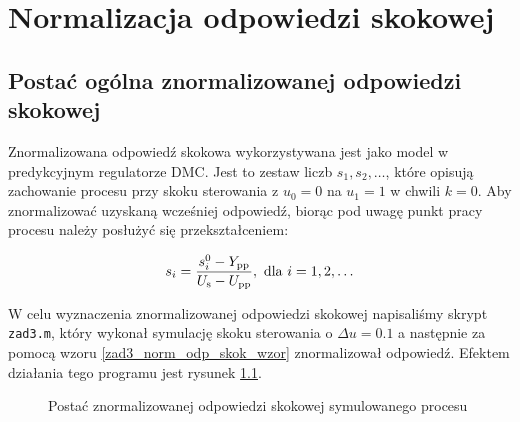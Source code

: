 \chapter{Normalizacja odpowiedzi skokowej}
\label{zad3}

\section{Postać ogólna znormalizowanej odpowiedzi skokowej}
Znormalizowana odpowiedź skokowa wykorzystywana jest jako model w predykcyjnym
regulatorze DMC. Jest to zestaw liczb $s_{1}, s_{2}, \ldots$, które opisują zachowanie
procesu przy skoku sterowania z $u_{\mathrm{0}}=\num{0}$ na $u_{\mathrm{1}}=\num{1}$ w chwili $k=\num{0}$. 
Aby znormalizować uzyskaną wcześniej odpowiedź, biorąc pod uwagę punkt pracy procesu należy
posłużyć się przekształceniem:

\begin{equation}
    s_{i} = \frac{s^{\mathrm{0}}_{i} - Y_{\mathrm{pp}}}{U_{\mathrm{s}} - U_{\mathrm{pp}}},  \hbox{ dla } i = 1,2,\ldots
    \label{zad3_norm_odp_skok_wzor}
\end{equation}

W celu wyznaczenia znormalizowanej odpowiedzi skokowej napisaliśmy skrypt \verb+zad3.m+,
który wykonał symulację skoku sterowania o $\Delta u = \num{0,1}$ a następnie za pomocą
wzoru \ref{zad3_norm_odp_skok_wzor} znormalizował odpowiedź. Efektem działania tego programu
jest rysunek \ref{zad3_norm_odp}.

\begin{figure}[b]
    \label{zad3_norm_odp}
    \centering
    \caption{Postać znormalizowanej odpowiedzi skokowej symulowanego procesu}
\end{figure}
